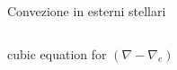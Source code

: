 \begin{wordonframe}{Convezione in esterni stellari}
\begin{columns}[T]
\begin{column}{0.45\textwidth}
        \end{column}
    \end{columns}
cubic equation for $(\nabla-\nabla_e)$
\end{wordonframe}

